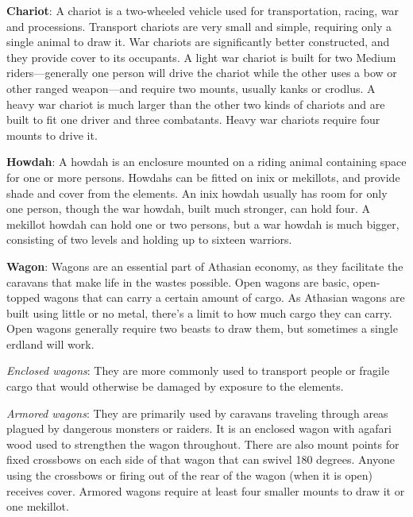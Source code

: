 \textbf{Chariot}: A chariot is a two-wheeled vehicle used for transportation, racing, war and processions. Transport chariots are very small and simple, requiring only a single animal to draw it. War chariots are significantly better constructed, and they provide cover to its occupants. A light war chariot is built for two Medium riders---generally one person will drive the chariot while the other uses a bow or other ranged weapon---and require two mounts, usually kanks or crodlus. A heavy war chariot is much larger than the other two kinds of chariots and are built to fit one driver and three combatants. Heavy war chariots require four mounts to drive it.

\textbf{Howdah}: A howdah is an enclosure mounted on a riding animal containing space for one or more persons. Howdahs can be fitted on inix or mekillots, and provide shade and cover from the elements. An inix howdah usually has room for only one person, though the war howdah, built much stronger, can hold four. A mekillot howdah can hold one or two persons, but a war howdah is much bigger, consisting of two levels and holding up to sixteen warriors.

\textbf{Wagon}: Wagons are an essential part of Athasian economy, as they facilitate the caravans that make life in the wastes possible. Open wagons are basic, open-topped wagons that can carry a certain amount of cargo. As Athasian wagons are built using little or no metal, there's a limit to how much cargo they can carry. Open wagons generally require two beasts to draw them, but sometimes a single erdland will work.

\textit{Enclosed wagons}: They are more commonly used to transport people or fragile cargo that would otherwise be damaged by exposure to the elements.

\textit{Armored wagons}: They are primarily used by caravans traveling through areas plagued by dangerous monsters or raiders. It is an enclosed wagon with agafari wood used to strengthen the wagon throughout. There are also mount points for fixed crossbows on each side of that wagon that can swivel 180 degrees. Anyone using the crossbows or firing out of the rear of the wagon (when it is open) receives cover. Armored wagons require at least four smaller mounts to draw it or one mekillot.
